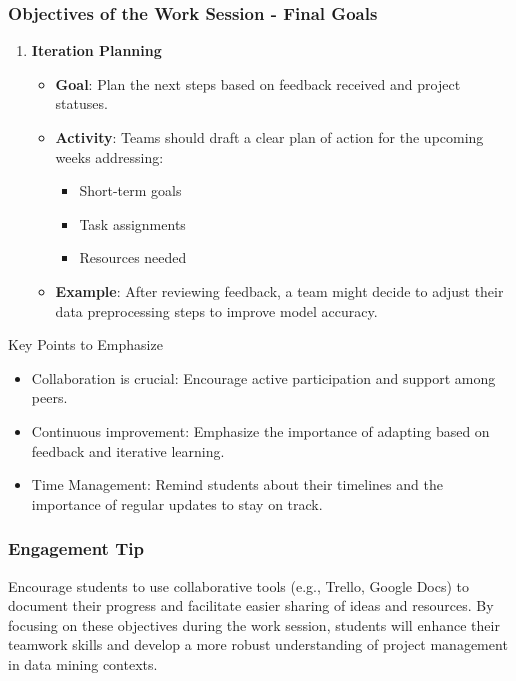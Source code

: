 \documentclass{beamer}
\begin{document}
\begin{frame}[fragile]
    \frametitle{Objectives of the Work Session - Final Goals}
    \begin{enumerate}[resume]
        \item \textbf{Iteration Planning}
        \begin{itemize}
            \item \textbf{Goal}: Plan the next steps based on feedback received and project statuses.
            \item \textbf{Activity}: Teams should draft a clear plan of action for the upcoming weeks addressing:
            \begin{itemize}
                \item Short-term goals
                \item Task assignments
                \item Resources needed
            \end{itemize}
            \item \textbf{Example}: After reviewing feedback, a team might decide to adjust their data preprocessing steps to improve model accuracy.
        \end{itemize}
    \end{enumerate}
    
    \begin{block}{Key Points to Emphasize}
        \begin{itemize}
            \item Collaboration is crucial: Encourage active participation and support among peers.
            \item Continuous improvement: Emphasize the importance of adapting based on feedback and iterative learning.
            \item Time Management: Remind students about their timelines and the importance of regular updates to stay on track.
        \end{itemize}
    \end{block}
\end{frame}

\begin{frame}[fragile]
    \frametitle{Engagement Tip}
    Encourage students to use collaborative tools (e.g., Trello, Google Docs) to document their progress and facilitate easier sharing of ideas and resources.  
    By focusing on these objectives during the work session, students will enhance their teamwork skills and develop a more robust understanding of project management in data mining contexts.
\end{frame}
\end{document}
